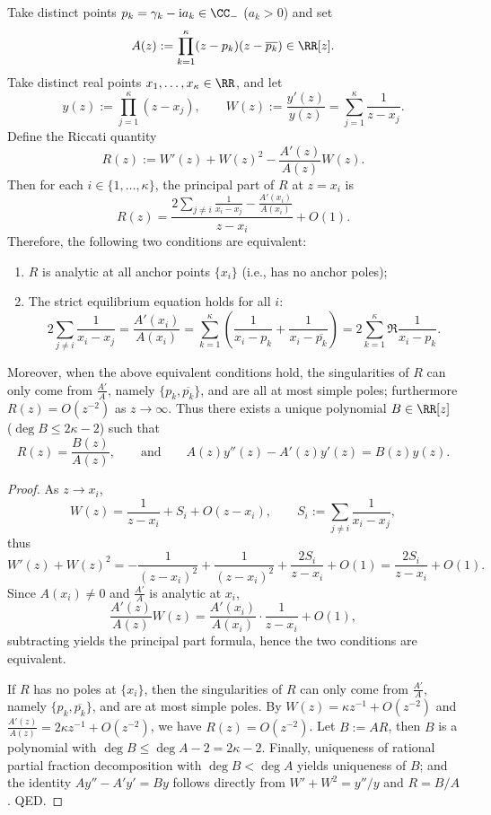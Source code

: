 \begin{conclusion}\label{con:xi-terminal-riccati-pole-cancellation-bethe-equilibrium}
Take distinct points \(p_k=\gamma_k-\mathrm{i}a_k\in\CC_{-}\) (\(a_k>0\)) and set
\[
A(z):=\prod_{k=1}^{\kappa}(z-p_k)(z-\overline{p_k})\in\RR[z].
\]
Take distinct real points \(x_1,\dots,x_\kappa\in\RR\), and let
\[
y(z):=\prod_{j=1}^{\kappa}(z-x_j),\qquad
W(z):=\frac{y'(z)}{y(z)}=\sum_{j=1}^{\kappa}\frac{1}{z-x_j}.
\]
Define the Riccati quantity
\[
R(z):=W'(z)+W(z)^2-\frac{A'(z)}{A(z)}W(z).
\]
Then for each \(i\in\{1,\dots,\kappa\}\), the principal part of \(R\) at \(z=x_i\) is
\[
R(z)=\frac{2\sum_{j\ne i}\frac{1}{x_i-x_j}-\frac{A'(x_i)}{A(x_i)}}{z-x_i}+O(1).
\]
Therefore, the following two conditions are equivalent:
\begin{enumerate}
  \item \(R\) is analytic at all anchor points \(\{x_i\}\) (i.e., has no anchor poles);
  \item The strict equilibrium equation holds for all \(i\):
  \[
  2\sum_{j\ne i}\frac{1}{x_i-x_j}
  =\frac{A'(x_i)}{A(x_i)}
  =\sum_{k=1}^{\kappa}\left(\frac{1}{x_i-p_k}+\frac{1}{x_i-\overline{p_k}}\right)
  =2\sum_{k=1}^{\kappa}\Re\frac{1}{x_i-p_k}.
  \]
\end{enumerate}
Moreover, when the above equivalent conditions hold, the singularities of \(R\) can only come from \(\frac{A'}{A}\), namely \(\{p_k,\overline{p_k}\}\), and are all at most simple poles; furthermore \(R(z)=O(z^{-2})\) as \(z\to\infty\).
Thus there exists a unique polynomial \(B\in\RR[z]\) (\(\deg B\le 2\kappa-2\)) such that
\[
R(z)=\frac{B(z)}{A(z)},
\qquad\text{and}\qquad
A(z)y''(z)-A'(z)y'(z)=B(z)y(z).
\]
\end{conclusion}
\begin{proof}[Proof]
As \(z\to x_i\),
\[
W(z)=\frac{1}{z-x_i}+S_i+O(z-x_i),\qquad S_i:=\sum_{j\ne i}\frac{1}{x_i-x_j},
\]
thus
\[
W'(z)+W(z)^2
=-\frac{1}{(z-x_i)^2}+\frac{1}{(z-x_i)^2}+\frac{2S_i}{z-x_i}+O(1)
=\frac{2S_i}{z-x_i}+O(1).
\]
Since \(A(x_i)\neq 0\) and \(\frac{A'}{A}\) is analytic at \(x_i\),
\[
\frac{A'(z)}{A(z)}W(z)=\frac{A'(x_i)}{A(x_i)}\cdot\frac{1}{z-x_i}+O(1),
\]
subtracting yields the principal part formula, hence the two conditions are equivalent.
\par
If \(R\) has no poles at \(\{x_i\}\), then the singularities of \(R\) can only come from \(\frac{A'}{A}\), namely \(\{p_k,\overline{p_k}\}\), and are at most simple poles.
By
\(
W(z)=\kappa z^{-1}+O(z^{-2})
\)
and
\(
\frac{A'(z)}{A(z)}=2\kappa z^{-1}+O(z^{-2})
\),
we have \(R(z)=O(z^{-2})\).
Let \(B:=AR\), then \(B\) is a polynomial with \(\deg B\le \deg A-2=2\kappa-2\).
Finally, uniqueness of rational partial fraction decomposition with \(\deg B<\deg A\) yields uniqueness of \(B\); and the identity
\(
A y''-A'y'=By
\)
follows directly from
\(
W'+W^2=y''/y
\)
and \(R=B/A\). QED.
\end{proof}

